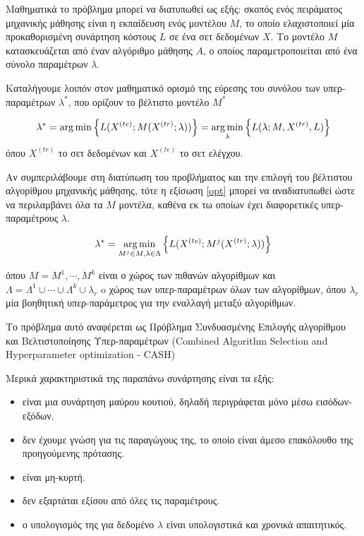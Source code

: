  	Μαθηματικά το πρόβλημα μπορεί να διατυπωθεί ως εξής: σκοπός ενός πειράματος μηχανικής μάθησης είναι η εκπαίδευση ενός μοντέλου $M$, το οποίο ελαχιστοποιεί μία προκαθορισμένη συνάρτηση κόστους $L$ σε ένα σετ δεδομένων $X$. Το μοντέλο $Μ$ κατασκευάζεται από έναν αλγόριθμο μάθησης $Α$, ο οποίος παραμετροποιείται από ένα σύνολο παραμέτρων $\lambda$.
 	
 	Καταλήγουμε λοιπόν στον μαθηματικό ορισμό της εύρεσης του συνόλου των υπερ-παραμέτρων $\lambda^*$, που ορίζουν το βέλτιστο μοντέλο $M^*$
 	
 	
 	\begin{equation}
 	\label{opt}
 	\lambda^* = \operatorname*{arg\,min} \left \{L(X^{(te)}; M(X^{(tr)}; \lambda)) \right \} = \operatorname*{arg\,min}_{\lambda} \left \{L(\lambda; M, X^{(tr)}, L) \right \}
 	\end{equation} 
 	όπου $X^{(tr)}$ το σετ δεδομένων και $X^{(te)}$ το σετ ελέγχου.
 	
 	Αν συμπεριλάβουμε στη διατύπωση του προβλήματος και την επιλογή του βέλτιστου αλγορίθμου μηχανικής μάθησης, τότε η εξίσωση \ref{opt} μπορεί να αναδιατυπωθεί ώστε να περιλαμβάνει όλα τα $M$ μοντέλα, καθένα εκ τω οποίων έχει διαφορετικές υπερ-παραμέτρους $\lambda$. 
 	
 	\begin{equation}
 	\label{optCash}
 	\lambda^* = \operatorname*{arg\,min}_{M^{j} \in M, \lambda \in \Lambda} \left \{L(X^{(te)}; M^{j}(X^{(tr)}; \lambda)) \right \}
 	\end{equation} 
 	
 	όπου $M ={M^{1}, \cdots, M^{k}}$ είναι ο χώρος των πιθανών αλγορίθμων και $ \Lambda = \Lambda^{1} \cup \cdots \cup \Lambda^{k} \cup {\lambda_r} $ o χώρος των υπερ-παραμέτρων όλων των αλγορίθμων, όπου $\lambda_r$ μία βοηθητική υπερ-παράμετρος για την εναλλαγή μεταξύ αλγορίθμων.
 	
 	Το πρόβλημα αυτό αναφέρεται ως Πρόβλημα Συνδυασμένης Επιλογής αλγορίθμου και Βελτιστοποίησης Υπερ-παραμέτρων (Combined Algorithm Selection and Hyperparameter optimization - CASH) \citep{DBLP:journals/corr/LoshchilovH16}
 	
	Μερικά χαρακτηριστικά της παραπάνω συνάρτησης είναι τα εξής:
	\begin{itemize}
		\item είναι μια συνάρτηση μαύρου κουτιού, δηλαδή περιγράφεται μόνο μέσω εισόδων-εξόδων.
		\item δεν έχουμε γνώση για τις παραγώγους της, το οποίο είναι άμεσο επακόλουθο της προηγούμενης πρότασης.
		\item είναι μη-κυρτή. 
		\item δεν εξαρτάται εξίσου από όλες τις παραμέτρους. 
		\item ο υπολογισμός της για δεδομένο $\lambda$ είναι υπολογιστικά και χρονικά απαιτητικός.
	\end{itemize}
	
